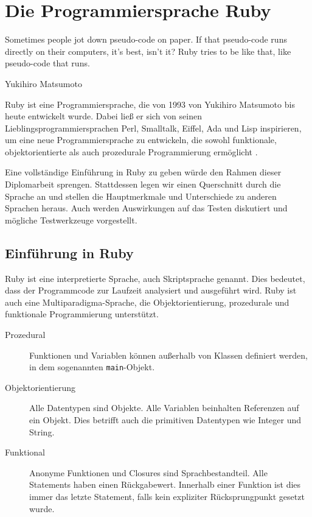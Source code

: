 \chapter{Die Programmiersprache Ruby}
\label{sec:ruby}
\epigraph{Sometimes people jot down pseudo-code on paper. If that pseudo-code runs directly on their computers, it's best, isn't it? Ruby tries to be like that, like pseudo-code that runs.}{Yukihiro Matsumoto}

Ruby ist eine Programmiersprache, die von 1993 von Yukihiro Matsumoto bis heute entwickelt wurde. Dabei ließ er sich von seinen Lieblingsprogrammiersprachen Perl, Smalltalk, Eiffel, Ada und Lisp inspirieren, um eine neue Programmiersprache zu entwickeln, die sowohl funktionale, objektorientierte als auch prozedurale Programmierung ermöglicht \citep{ruby_visual_identity_team_about_2011}.

Eine vollständige Einführung in Ruby zu geben würde den Rahmen dieser Diplomarbeit sprengen. Stattdessen legen wir einen Querschnitt durch die Sprache an und stellen die Hauptmerkmale und Unterschiede zu anderen Sprachen heraus. Auch werden Auswirkungen auf das Testen diskutiert und mögliche Testwerkzeuge vorgestellt.

\section{Einführung in Ruby}
Ruby ist eine interpretierte Sprache, auch Skriptsprache genannt. Dies bedeutet, dass der Programmcode zur Laufzeit analysiert und ausgeführt wird. Ruby ist auch eine Multiparadigma-Sprache, die Objektorientierung, prozedurale und funktionale Programmierung unterstützt.
\begin{description}
 \item[Prozedural] Funktionen und Variablen können außerhalb von Klassen definiert werden, in dem sogenannten \texttt{main}-Objekt.
 \item[Objektorientierung] Alle Datentypen sind Objekte. Alle Variablen beinhalten Referenzen auf ein Objekt. Dies betrifft auch die primitiven Datentypen wie Integer und String.
 \item[Funktional] Anonyme Funktionen und Closures sind Sprachbestandteil. Alle Statements haben einen Rückgabewert. Innerhalb einer Funktion ist dies immer das letzte Statement, falls kein expliziter Rücksprungpunkt gesetzt wurde.
\end{description}


